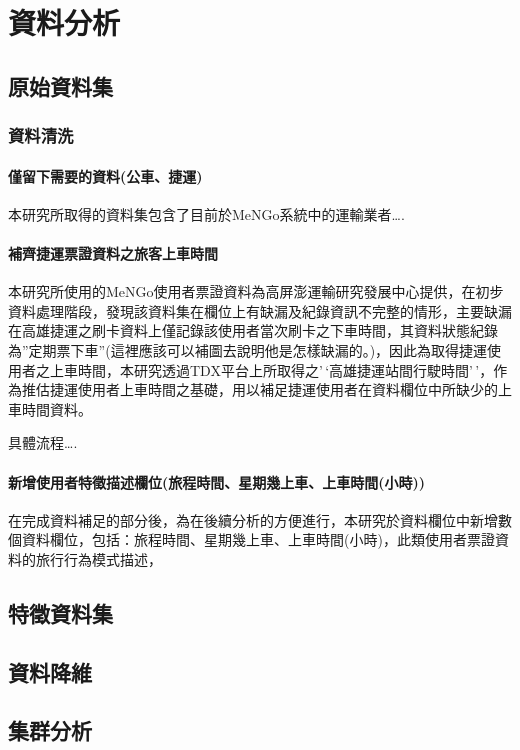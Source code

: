 
\providecommand{\tightlist}{%
  \setlength{\itemsep}{0pt}\setlength{\parskip}{0pt}
}

\chapter{資料分析}\label{ux8cc7ux6599ux5206ux6790}

\section{原始資料集}\label{ux539fux59cbux8cc7ux6599ux96c6}

\subsection{資料清洗}\label{ux8cc7ux6599ux6e05ux6d17}

\subsubsection{僅留下需要的資料(公車、捷運)}\label{ux50c5ux7559ux4e0bux9700ux8981ux7684ux8cc7ux6599ux516cux8ecaux6377ux904b}

本研究所取得的資料集包含了目前於MeNGo系統中的運輸業者\ldots.

\subsubsection{補齊捷運票證資料之旅客上車時間}\label{ux88dcux9f4aux6377ux904bux7968ux8b49ux8cc7ux6599ux4e4bux65c5ux5ba2ux4e0aux8ecaux6642ux9593}

本研究所使用的MeNGo使用者票證資料為高屏澎運輸研究發展中心提供，在初步資料處理階段，發現該資料集在欄位上有缺漏及紀錄資訊不完整的情形，主要缺漏在高雄捷運之刷卡資料上僅記錄該使用者當次刷卡之下車時間，其資料狀態紀錄為''定期票下車''(這裡應該可以補圖去說明他是怎樣缺漏的。)，因此為取得捷運使用者之上車時間，本研究透過TDX平台上所取得之'\,`高雄捷運站間行駛時間'\,'，作為推估捷運使用者上車時間之基礎，用以補足捷運使用者在資料欄位中所缺少的上車時間資料。

具體流程\ldots.

\subsubsection{新增使用者特徵描述欄位(旅程時間、星期幾上車、上車時間(小時))}\label{ux65b0ux589eux4f7fux7528ux8005ux7279ux5fb5ux63cfux8ff0ux6b04ux4f4dux65c5ux7a0bux6642ux9593ux661fux671fux5e7eux4e0aux8ecaux4e0aux8ecaux6642ux9593ux5c0fux6642}

在完成資料補足的部分後，為在後續分析的方便進行，本研究於資料欄位中新增數個資料欄位，包括：旅程時間、星期幾上車、上車時間(小時)，此類使用者票證資料的旅行行為模式描述，

\section{特徵資料集}\label{ux7279ux5fb5ux8cc7ux6599ux96c6}

\section{資料降維}\label{ux8cc7ux6599ux964dux7dad}

\section{集群分析}\label{ux96c6ux7fa4ux5206ux6790}

